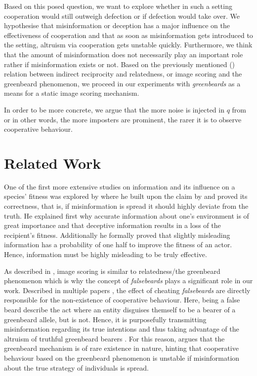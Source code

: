 \documentclass[sigconf]{acmart}
\newcommand{\greenbeards}{\textit{greenbeards}\xspace}
\begin{document}
    Based on this posed question, we want to explore whether in such a setting cooperation would still outweigh defection or if defection would take over.
    We hypothesise that misinformation or deception has a major influence on the effectiveness of cooperation and that as soon as misinformation gets introduced to the setting, altruism via cooperation gets unstable quickly.
    Furthermore, we think that the amount of misinformation does not necessarily play an important role rather if misinformation exists or not.
    Based on the previously mentioned () relation between indirect reciprocity and relatedness, or image scoring and the greenbeard phenomenon, we proceed in our experiments with \greenbeards as a means for a static image scoring mechanism.

    In order to be more concrete, we argue that the more noise is injected in $q$ from  or in other words, the more imposters are prominent, the rarer it is to observe cooperative behaviour.


    \section{Related Work}\label{sec:related_work}
    One of the first more extensive studies on information and its influence on a species' fitness was explored by \citeauthor{wallace_misinformation_1973} \cite{wallace_misinformation_1973} where he built upon the claim by \citeauthor{fisherGeneticalTheoryNatural1930} \cite{fisherGeneticalTheoryNatural1930} and proved its correctness, that is, if misinformation is spread it should highly deviate from the truth.
    He explained first why accurate information about one's environment is of great importance and that deceptive information results in a loss of the recipient's fitness.
    Additionally he formally proved that slightly misleading information has a probability of one half to improve the fitness of an actor.
    Hence, information must be highly misleading to be truly effective.

    As described in , image scoring is similar to relatedness/the greenbeard phenomenon which is why the concept of \textit{falsebeards} plays a significant role in our work.
    Described in multiple papers \cite{SelfishGeneRichard,roberts_kin_2019,west_altruism_2010}, the effect of cheating \textit{falsebeards} are directly responsible for the non-existence of cooperative behaviour.
    Here, being a false beard describe the act where an entity disguises themself to be a bearer of a greenbeard allele, but is not.
    Hence, it is purposefully transmitting misinformation regarding its true intentions and thus taking advantage of the altruism of truthful greenbeard bearers \cite{SelfishGeneRichard}.
    For this reason, \citeauthor{SelfishGeneRichard} \cite{SelfishGeneRichard} argues that the greenbeard mechanism is of rare existence in nature, hinting that cooperative behaviour based on the greenbeard phenomenon is unstable if misinformation about the true strategy of individuals is spread.
\end{document}
